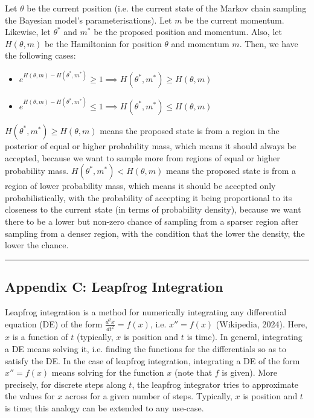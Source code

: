 \documentclass[conference]{IEEEtran}
\begin{document}
Let $\theta$ be the current position (i.e. the current state of the Markov chain sampling the Bayesian model's parameterisations). Let $m$ be the current momentum. Likewise, let $\theta^*$ and $m^*$ be the proposed position and momentum. Also, let $H(\theta, m)$ be the Hamiltonian for position $\theta$ and momentum $m$. Then, we have the following cases:\\

\begin{itemize}
	\item $e^{H(\theta, m) - H(\theta^*, m^*)} \geq 1 \implies H(\theta^*, m^*) \geq H(\theta, m)$
	\item $e^{H(\theta, m) - H(\theta^*, m^*)} \leq 1 \implies H(\theta^*, m^*) \leq H(\theta, m)$\\
\end{itemize}

$H(\theta^*, m^*) \geq H(\theta, m)$ means the proposed state is from a region in the posterior of equal or higher probability mass, which means it should always be accepted, because we want to sample more from regions of equal or higher probability mass. $H(\theta^*, m^*) < H(\theta, m)$ means the proposed state is from a region of lower probability mass, which means it should be accepted only probabilistically, with the probability of accepting it being proportional to its closeness to the current state (in terms of probability density), because we want there to be a lower but non-zero chance of sampling from a sparser region after sampling from a denser region, with the condition that the lower the density, the lower the chance.

\par\noindent\rule{0.49\textwidth}{0.1pt}

\subsection*{Appendix C: Leapfrog Integration}
Leapfrog integration is a method for numerically integrating any differential equation (DE) of the form $\frac{d^2x}{dt^2} = f(x)$, i.e. $x'' = f(x)$ (Wikipedia, 2024). Here, $x$ is a function of $t$ (typically, $x$ is position and $t$ is time). In general, integrating a DE means solving it, i.e. finding the functions for the differentials so as to satisfy the DE. In the case of leapfrog integration, integrating a DE of the form $x'' = f(x)$ means solving for the function $x$ (note that $f$ is given). More precisely, for discrete steps along $t$, the leapfrog integrator tries to approximate the values for $x$ across for a given number of steps. Typically, $x$ is position and $t$ is time; this analogy can be extended to any use-case.\\
\end{document}
